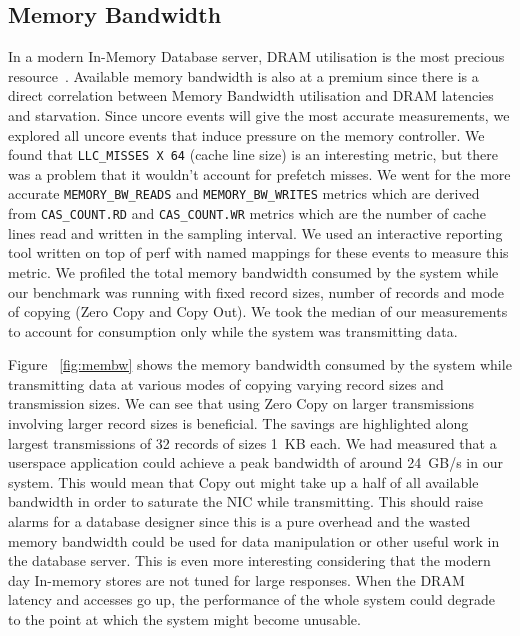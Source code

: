 \subsection{Memory Bandwidth}
In a modern In-Memory Database server, DRAM utilisation is the most precious resource~\cite{ramcloudfast}. 
 Available memory bandwidth is also at a premium since there is a direct correlation between Memory Bandwidth
 utilisation and DRAM latencies and starvation. Since uncore events will give the most accurate measurements,
 we explored all uncore events that induce pressure on the memory controller. We found that 
\texttt{LLC\_MISSES X 64} (cache line size) is an interesting metric, but there was a problem that it wouldn't account for prefetch 
 misses. We went for the more accurate \texttt{MEMORY\_BW\_READS} and \texttt{MEMORY\_BW\_WRITES} metrics which are derived from 
 \texttt{CAS\_COUNT.RD} and \texttt{CAS\_COUNT.WR} metrics which are the number of cache lines read and written in the sampling 
 interval. We used an interactive reporting tool written on top of perf with named mappings for these events
 to measure this metric. We profiled the total memory bandwidth consumed by the system while our benchmark 
 was running with fixed record sizes, number of records and mode of copying (Zero Copy and Copy Out). We took the median of our measurements 
 to account for consumption only while the system was transmitting data.



Figure ~\ref{fig:membw} shows the memory bandwidth consumed by the system while transmitting data at various modes 
of copying varying record sizes and transmission sizes. We can see that using Zero Copy on larger transmissions involving 
larger record sizes is beneficial. The savings are highlighted along largest transmissions of 32 records of sizes 1~KB each. 
 We had measured that a userspace application could achieve a peak bandwidth of around 24~GB/s in our system. This would mean that Copy out 
 might take up a half of all available bandwidth in order to saturate the NIC while transmitting. This should raise alarms for a database 
 designer since this is a pure overhead and the wasted memory bandwidth could be used for data manipulation or other useful work in the database 
 server. This is even more interesting considering that the modern day In-memory stores are not tuned for large responses.
  When the DRAM latency and accesses go up, the performance of the whole system could degrade to the point at which the system might become unusable.


